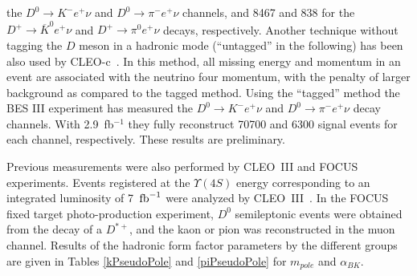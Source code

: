 the $D^0 \to K^{-} e^+\nu$ and $D^0\to \pi^{-} e^+\nu$ channels, and 8467 and 838 for the 
$D^+\to {\overline K}^{0} e^+\nu$ and $D^+\to \pi^{0} e^+\nu$ decays, respectively. 
Another technique without tagging the $D$ meson in a hadronic mode (``untagged'' in the following) has been also 
used by CLEO-c~\cite{Dobbs:2007aa}. In this method, all missing energy and momentum in 
an event are associated with the neutrino four momentum, with the penalty of larger background as compared to the tagged method. 
Using the ``tagged'' method the BES III experiment has measured the $D^0 \to {K}^- e^+ \nu$ and 
$D^0 \to {\pi}^- e^+ \nu$ decay channels. With 2.9~fb$^{-1}$ they fully reconstruct 70700 and 6300 signal 
events for each channel, respectively. These results are preliminary. 

  Previous measurements were also performed by CLEO~III and FOCUS experiments. 
Events registered at the $\Upsilon (4S)$ energy corresponding to an integrated luminosity of 7 $\mbox{\,fb}^{-1}$ were 
analyzed by CLEO~III~\cite{Huang:2004fra}. 
In the FOCUS fixed target photo-production experiment, $D^0$ semileptonic events were obtained from the decay of 
a $D^{\ast +}$, and the kaon or pion was reconstructed in the muon channel. 
 Results of the hadronic form factor parameters by the different groups are given in Tables
\ref{kPseudoPole} and \ref{piPseudoPole} for $m_{pole}$ and $\alpha_{BK}$. 

